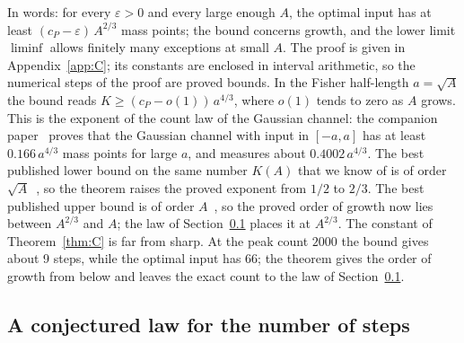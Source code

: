\documentclass[10pt,letterpaper]{article}
\begin{document}
In words: for every $\varepsilon>0$ and every large enough $A$, the optimal input has at least $(c_P-\varepsilon)\,A^{2/3}$ mass
points; the bound concerns growth, and the lower limit $\liminf$ allows finitely many exceptions at small $A$. The proof is given
in Appendix~\ref{app:C}; its constants are enclosed in interval arithmetic, so the numerical steps of the proof are proved bounds. In the Fisher half-length $a=\sqrt A$ the bound reads $K\ge(c_P-o(1))\,a^{4/3}$, where $o(1)$ tends to zero as $A$ grows. This is the exponent of the count
law of the Gaussian channel: the companion paper~\cite{Paper1} proves that the Gaussian channel with input in $[-a,a]$ has at least
$0.166\,a^{4/3}$ mass points for large $a$, and measures about $0.4002\,a^{4/3}$. The best published lower bound on the same number $K(A)$
that we know of is of order $\sqrt A$~\cite{DBS2021,BDS2024}, so the theorem raises the proved exponent from $1/2$ to $2/3$. The
best published upper bound is of order $A$~\cite{BDS2024}, so the proved order of growth now lies between $A^{2/3}$ and $A$; the law
of Section~\ref{sec:countlaw} places it at $A^{2/3}$. The constant of Theorem~\ref{thm:C} is far from sharp. At the peak count
$2000$ the bound gives about 9 steps, while the optimal input has 66; the theorem gives the order of growth from below and leaves the
exact count to the law of Section~\ref{sec:countlaw}.



\subsection{A conjectured law for the number of steps}\label{sec:countlaw}
\end{document}
